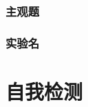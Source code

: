 \documentclass[color=orange]{textbook-cn}%
\begin{document}
\lipsum[1-6]
\begin{Improve}
\begin{QsNum}
\item \lipsum[1][1-4]
\item \lipsum[1][1-4]
\item \lipsum[1][1-4]
\item \lipsum[1][1-4]
\item \lipsum[1][1-4]
\item \lipsum[1][1-4]
\item \lipsum[1][1-4]
\item \lipsum[1][1-4]
\end{QsNum}
\begin{QsNum}
\item \lipsum[1][1-4]
\item \lipsum[1][1-4]
\item \lipsum[1][1-4]
\item \lipsum[1][1-4]
\item \lipsum[1][1-4]
\item \lipsum[1][1-4]
\item \lipsum[1][1-4]
\item \lipsum[1][1-4]
\end{QsNum}
\tcblower
\lipsum[1]
\end{Improve}





\begin{Quiz}
\section{主观题}
\end{Quiz}



\begin{Project}
\section{实验名}

\begin{Theorem*}[定理名称]
\lipsum[1][1-3]
\end{Theorem*}
\end{Project}


\part*{自我检测}
\end{document}
